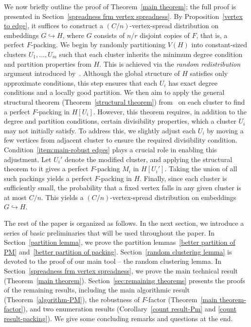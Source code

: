 \documentclass[11pt, letterpaper]{amsart}
\theoremstyle{plain}
\numberwithin{equation}{section}
\theoremstyle{definition}
\begin{document}
     We now briefly outline the proof of Theorem~\ref{main theorem}; the full proof is presented in Section~\ref{spreadness frm vertex spreadness}. 
     By Proposition~\ref{vertex to edge}, it suffices to construct a $(C/n)$-vertex-spread distribution on embeddings $G\hookrightarrow H$, where $G$ consists of \(n/r\) disjoint copies of \(F\), that is, a perfect \(F\)-packing. 
     We begin by randomly partitioning \(V(H)\) into constant-sized clusters \(U_1,\dots,U_m\) such that each cluster inherits the minimum degree condition and partition properties from \(H\). 
     This is achieved via the \emph{random redistribution} argument introduced by~\cite{kelly2024optimal}. Although the global structure of \(H\) satisfies only approximate conditions, this step ensures that each \(U_i\) has exact degree conditions and a locally good partition. 
     We then aim to apply the general structural theorem (Theorem~\ref{structural theorem}) from~\cite{han2020complexity} on each cluster to find a perfect $F$-packing in \(H[U_i]\). 
     However, this theorem requires, in addition to the degree and partition conditions, certain divisibility properties, which a cluster \(U_i\) may not initially satisfy. 
     To address this, we slightly adjust each \(U_i\) by moving a few vertices from adjacent cluster to ensure the required divisibility condition. 
     Condition~\ref{item:main-robust edges} plays a crucial role in enabling this adjustment.
     Let \(U_i'\) denote the modified cluster, and applying the structural theorem to it gives a perfect $F$-packing \(M_i\) in \(H[U_i']\). 
     Taking the union of all such packings yields a perfect \(F\)-packing in \(H\). 
     Finally, since each cluster is sufficiently small, the probability that a fixed vertex falls in any given cluster is at most \(C/n\).
     This yields a \((C/n)\)-vertex-spread distribution on embeddings \(G \hookrightarrow H\). 
     
     

    The rest of the paper is organized as follows. 
    In the next section, we introduce a series of basic preliminaries that will be used throughout the paper. 
    In Section~\ref{partition lemma}, we prove the partition lemmas~\ref{better partition of PM} and~\ref{better partition of packing}. 
    Section~\ref{random clustering lemma} is devoted to the proof of our main tool -- the random clustering lemma. 
    In Section~\ref{spreadness frm vertex spreadness}, we prove the main technical result (Theorem~\ref{main theorem}). 
    Section~\ref{sec:remaining theorems} presents the proofs of the remaining results, including the main algorithmic result (Theorem~\ref{algorithm-PM}), the robustness of \(F\)-factor (Theorem~\ref{main theorem-factor}), and two enumeration results (Corollary~\ref{count result-Pm} and \ref{count result-packing}).
    We give some concluding remarks and questions at the end. 
\end{document}

